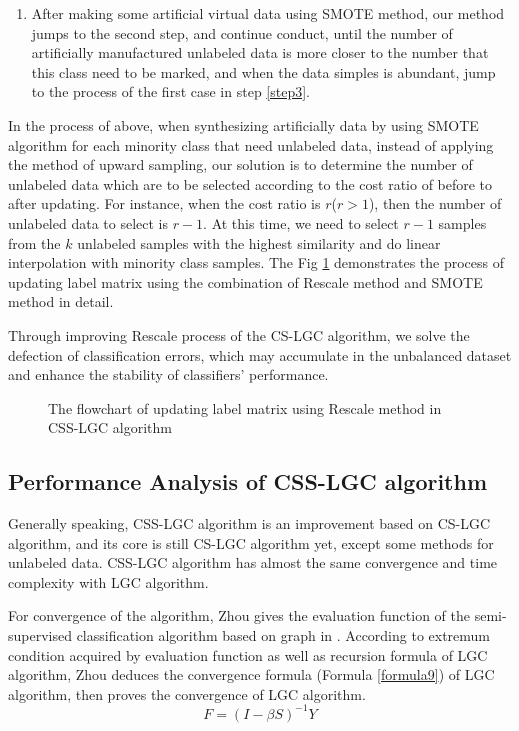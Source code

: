 \documentclass{svjour3}                     %
\begin{document}
\begin{enumerate}[1)]
\item After making some artificial virtual data using SMOTE method, our method jumps to the second step, and continue conduct, until the number of artificially manufactured unlabeled data is more closer to
the number that this class need to be marked, and when the data simples is abundant, jump to the process of the first case in step \ref{step3}.

\end{enumerate}

In the process of above, when synthesizing artificially data by using SMOTE algorithm for each minority class that need unlabeled data, instead of applying the method of upward sampling, our solution is to determine the number of unlabeled data which are to be selected according to the cost ratio of before to after updating. For instance, when the cost ratio is $r$($r>1$), then the number of unlabeled data to select is $r-1$. At this time, we need to select $r-1$ samples from the $k$ unlabeled samples with the highest similarity and do linear interpolation with minority class samples. The Fig \ref{fig:flowchart1} demonstrates the process of updating label matrix using the combination of Rescale method and SMOTE method in detail.

Through improving Rescale process of the CS-LGC algorithm, we solve the defection of classification errors, which may accumulate in the unbalanced dataset and enhance the stability of classifiers' performance.
\begin{figure}[ht]

\caption{The flowchart of updating label matrix using Rescale method in CSS-LGC algorithm}\label{fig:flowchart1}
\end{figure}

\subsection{Performance Analysis of CSS-LGC algorithm}
Generally speaking, CSS-LGC algorithm is an improvement based on CS-LGC algorithm, and its core is still CS-LGC algorithm yet, except some methods for unlabeled data. CSS-LGC algorithm has almost the same convergence and time complexity with LGC algorithm.

For convergence of the algorithm, Zhou gives the evaluation function of the semi-supervised classification algorithm based on graph in \cite{zhou2004learning}. According to extremum condition acquired by evaluation function as well as recursion formula of LGC algorithm, Zhou deduces the convergence formula (Formula \ref{formula9}) of LGC algorithm, then proves the convergence of LGC algorithm.
\begin{equation}\label{formula9}
  F = {(I - \beta S)^{ - 1}}Y
\end{equation}
\end{document}
